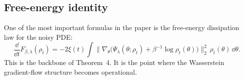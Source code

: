 \subsection*{Free-energy identity}
One of the most important formulas in the paper is the free-energy dissipation law for the noisy PDE:
\begin{equation}
\label{eq:free-energy-note}
\frac{\dd}{\dd t}F_{\beta,\lambda}(\rho_t)
=
-2\xi(t)\int
\bigl\|\nabla_\theta \bigl(\Psi_\lambda(\theta;\rho_t)+\beta^{-1}\log \rho_t(\theta)\bigr)\bigr\|_2^2\,
\rho_t(\theta)\,\dd\theta.
\end{equation}
This is the backbone of Theorem~4. It is the point where the Wasserstein gradient-flow structure becomes operational.
